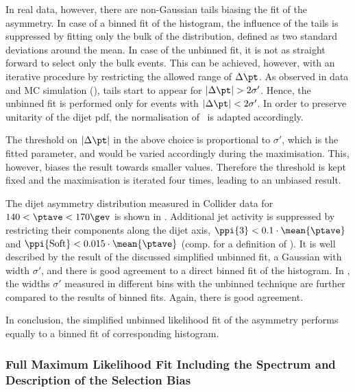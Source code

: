In real data, however, there are non-Gaussian tails biasing the fit of the asymmetry.
In case of a binned fit of the histogram, the influence of the tails is suppressed by
fitting only the bulk of the distribution, defined as two standard deviations around the mean.
In case of the unbinned fit, it is not as straight
forward to select only the bulk events.
This can be achieved, however, with an iterative procedure by restricting
the allowed range of $\Delta\pt$.
As observed in data and MC simulation (), tails start to appear for \mbox{$|\Delta\pt| > 2\sigma'$}.
Hence, the unbinned fit is performed only for events with \mbox{$|\Delta\pt| < 2\sigma'$}.
In order to preserve unitarity of the dijet pdf, the normalisation
of~ is adapted accordingly.

The threshold on $|\Delta\pt|$ in the above choice is proportional to $\sigma'$, which is the fitted parameter, and would be varied accordingly during the maximisation.
This, however, biases the result towards smaller  values.
Therefore the threshold is kept fixed and the maximisation is iterated
four times, leading to an unbiased result.

The dijet asymmetry distribution measured in Collider data for \mbox{$140 <
  \ptave < 170\gev$} is shown in
.
Additional jet activity is suppressed by restricting their \pt components
along the dijet axis, \mbox{$\ppi{3} < 0.1\cdot\mean{\ptave}$} and
\mbox{$\ppi{\text{Soft}} < 0.015\cdot\mean{\ptave}$} (comp.  for
a definition of \pp).
It is well described by the result of the discussed simplified unbinned fit, \ie a Gaussian with width $\sigma'$, and there is good agreement to a direct binned fit of the histogram.
In , the widths $\sigma'$ measured in different \ptave bins with the unbinned technique are further compared to the results of binned fits.
Again, there is good agreement.

In conclusion, the simplified unbinned likelihood fit of the asymmetry performs equally to a binned fit of corresponding histogram.



\subsubsection{Full Maximum Likelihood Fit Including the Spectrum and Description of the Selection Bias}\label{sec:ResFit:DataDriven:FullFit}

